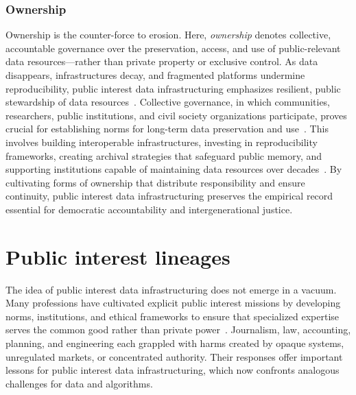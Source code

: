 \documentclass[acmsmall,screen]{acmart}
\begin{document}
\subsubsection*{Ownership}
Ownership is the counter-force to erosion. Here, \textit{ownership} denotes collective, accountable governance over the preservation, access, and use of public-relevant data resources---rather than private property or exclusive control. As data disappears, infrastructures decay, and fragmented platforms undermine reproducibility, public interest data infrastructuring emphasizes resilient, public stewardship of data resources~\cite{Freelon_ComputationalResearchPostAPI_2018,gaffney_caveat_2018}. Collective governance, in which communities, researchers, public institutions, and civil society organizations participate, proves crucial for establishing norms for long-term data preservation and use~\cite{schwartz_archives_2002,stoler_ColonialArchivesArts_2002}. This involves building interoperable infrastructures, investing in reproducibility frameworks, creating archival strategies that safeguard public memory, and supporting institutions capable of maintaining data resources over decades~\cite{acker_DataCraftTheory_2019,Plantin_Infrastructurestudiesmeet_2016}. By cultivating forms of ownership that distribute responsibility and ensure continuity, public interest data infrastructuring preserves the empirical record essential for democratic accountability and intergenerational justice.

\section*{Public interest lineages}
The idea of public interest data infrastructuring does not emerge in a vacuum. Many professions have cultivated explicit public interest missions by developing norms, institutions, and ethical frameworks to ensure that specialized expertise serves the common good rather than private power~\cite{stapletonWhoHasInterest2022,dantecInfrastructuringFormationPublics2013,costanza-chockDesignJustice2020}. Journalism, law, accounting, planning, and engineering each grappled with harms created by opaque systems, unregulated markets, or concentrated authority. Their responses offer important lessons for public interest data infrastructuring, which now confronts analogous challenges for data and algorithms.
\end{document}
